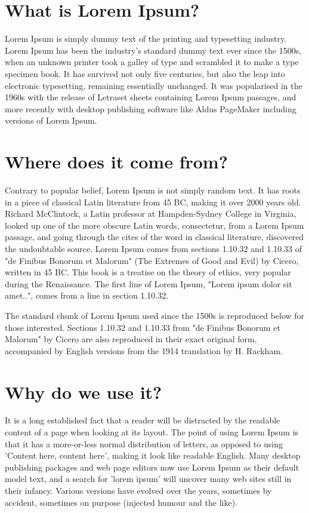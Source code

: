 \section*{What is Lorem Ipsum?}

Lorem Ipsum is simply dummy text of the printing and typesetting industry. Lorem
Ipsum has been the industry's standard dummy text ever since the 1500s, when an
unknown printer took a galley of type and scrambled it to make a type specimen
book. It has survived not only five centuries, but also the leap into electronic
typesetting, remaining essentially unchanged. It was popularised in the 1960s
with the release of Letraset sheets containing Lorem Ipsum passages, and more
recently with desktop publishing software like Aldus PageMaker including
versions of Lorem Ipsum.


\section*{Where does it come from?}

Contrary to popular belief, Lorem Ipsum is not simply random text. It has roots
in a piece of classical Latin literature from 45 BC, making it over 2000 years
old. Richard McClintock, a Latin professor at Hampden-Sydney College in
Virginia, looked up one of the more obscure Latin words, consectetur, from a
Lorem Ipsum passage, and going through the cites of the word in classical
literature, discovered the undoubtable source. Lorem Ipsum comes from sections
1.10.32 and 1.10.33 of "de Finibus Bonorum et Malorum" (The Extremes of Good and
Evil) by Cicero, written in 45 BC. This book is a treatise on the theory of
ethics, very popular during the Renaissance. The first line of Lorem Ipsum,
"Lorem ipsum dolor sit amet..", comes from a line in section 1.10.32.


The standard chunk of Lorem Ipsum used since the 1500s is reproduced below for
those interested. Sections 1.10.32 and 1.10.33 from "de Finibus Bonorum et
Malorum" by Cicero are also reproduced in their exact original form, accompanied
by English versions from the 1914 translation by H. Rackham.

\section*{Why do we use it?}

It is a long established fact that a reader will be distracted by the readable
content of a page when looking at its layout. The point of using Lorem Ipsum is
that it has a more-or-less normal distribution of letters, as opposed to using
'Content here, content here', making it look like readable English. Many desktop
publishing packages and web page editors now use Lorem Ipsum as their default
model text, and a search for 'lorem ipsum' will uncover many web sites still in
their infancy. Various versions have evolved over the years, sometimes by
accident, sometimes on purpose (injected humour and the like).

